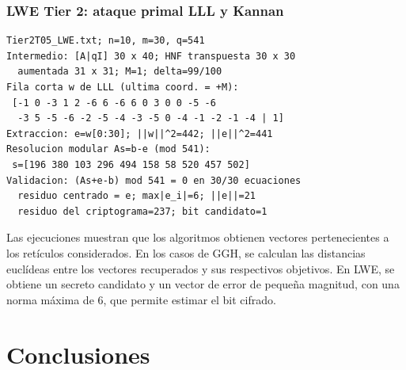 \documentclass[12pt,a4paper]{article}
\begin{document}
\par\medskip
\noindent\begin{minipage}{\textwidth}
\subsubsection*{LWE Tier 2: ataque primal LLL y Kannan}
\begin{verbatim}
Tier2T05_LWE.txt; n=10, m=30, q=541
Intermedio: [A|qI] 30 x 40; HNF transpuesta 30 x 30
  aumentada 31 x 31; M=1; delta=99/100
Fila corta w de LLL (ultima coord. = +M):
 [-1 0 -3 1 2 -6 6 -6 6 0 3 0 0 -5 -6
  -3 5 -5 -6 -2 -5 -4 -3 -5 0 -4 -1 -2 -1 -4 | 1]
Extraccion: e=w[0:30]; ||w||^2=442; ||e||^2=441
Resolucion modular As=b-e (mod 541):
 s=[196 380 103 296 494 158 58 520 457 502]
Validacion: (As+e-b) mod 541 = 0 en 30/30 ecuaciones
  residuo centrado = e; max|e_i|=6; ||e||=21
  residuo del criptograma=237; bit candidato=1
\end{verbatim}
\end{minipage}\par\medskip
Las ejecuciones muestran que los algoritmos obtienen vectores pertenecientes a los retículos considerados.
En los casos de GGH, se calculan las distancias euclídeas entre los vectores recuperados y sus respectivos objetivos.
En LWE, se obtiene un secreto candidato y un vector de error de pequeña magnitud, con una norma máxima de 6, que permite estimar el bit cifrado.


\section{Conclusiones}
\end{document}

